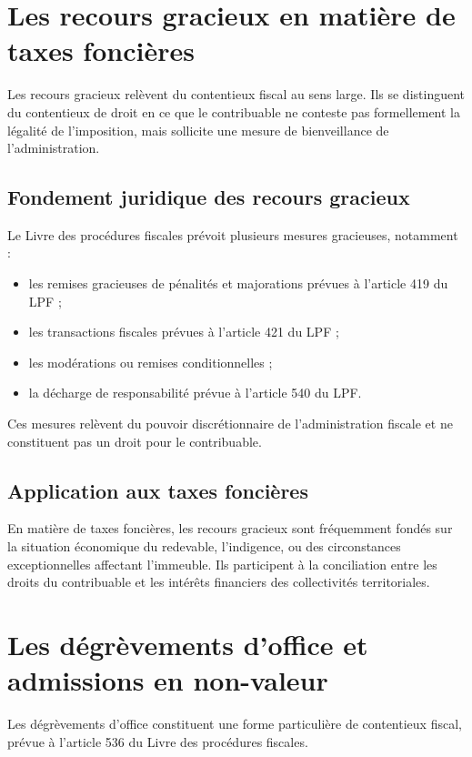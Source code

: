 \documentclass[Cours_contentieuxTF2026.tex]{subfiles}
\begin{document}
\section{Les recours gracieux en matière de taxes foncières}

Les recours gracieux relèvent du contentieux fiscal au sens large. Ils se distinguent du
contentieux de droit en ce que le contribuable ne conteste pas formellement la
légalité de l’imposition, mais sollicite une mesure de bienveillance de
l’administration.

\subsection{Fondement juridique des recours gracieux}

Le Livre des procédures fiscales prévoit plusieurs mesures gracieuses, notamment :
\begin{itemize}
	\item les remises gracieuses de pénalités et majorations prévues à l’article 419 du
	LPF ;
	\item les transactions fiscales prévues à l’article 421 du LPF ;
	\item les modérations ou remises conditionnelles ;
	\item la décharge de responsabilité prévue à l’article 540 du LPF.
\end{itemize}

Ces mesures relèvent du pouvoir discrétionnaire de l’administration fiscale et ne
constituent pas un droit pour le contribuable.

\subsection{Application aux taxes foncières}

En matière de taxes foncières, les recours gracieux sont fréquemment fondés sur la
situation économique du redevable, l’indigence, ou des circonstances
exceptionnelles affectant l’immeuble. Ils participent à la conciliation entre les droits
du contribuable et les intérêts financiers des collectivités territoriales.

\section{Les dégrèvements d’office et admissions en non-valeur}

Les dégrèvements d’office constituent une forme particulière de contentieux fiscal,
prévue à l’article 536 du Livre des procédures fiscales.
\end{document}
